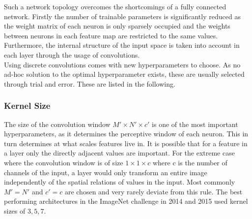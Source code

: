 Such a network topology overcomes the shortcomings of a fully connected network. Firstly the number of trainable parameters is significantly reduced as the weight matrix of each neuron is only sparsely occupied and the weights between neurons in each feature map are restricted to the same values. Furthermore, the internal structure of the input space is taken into account in each layer through the usage of convolutions. \\

Using discrete convolutions comes with new hyperparameters to choose. As no ad-hoc solution to the optimal hyperparameter exists, these are usually selected through trial and error. These are listed in the following.

\subsubsection{Kernel Size}
The size of the convolution window $M' \times N' \times c'$ is one of the most important hyperparameters, as it determines the perceptive window of each neuron. This in turn determines at what scales features live in. It is possible that for a feature in a layer only the directly adjacent values are important. For the extreme case where the convolution window is of size $1\times 1 \times c$ where c is the number of channels of the input, a layer would only transform an entire image independently of the spatial relations of values in the input. Most commonly $M'=N'$ and $c'=c$ are chosen and very rarely deviate from this rule. The best performing architectures in the ImageNet challenge \cite{imagenet_cvpr09} in 2014 \cite{Szegedy2015} and 2015 \cite{He2015} used kernel sizes of $3,5,7$.



